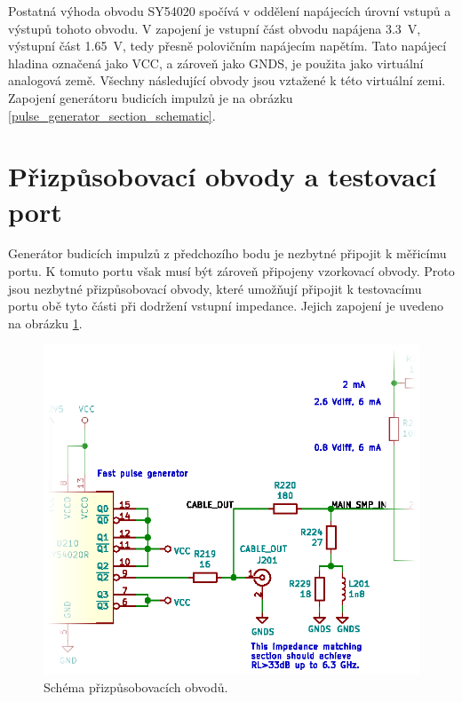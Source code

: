 Postatná výhoda obvodu SY54020 spočívá v oddělení napájecích úrovní vstupů a výstupů tohoto obvodu. V zapojení je vstupní část obvodu napájena \SI{3.3}{\volt}, výstupní část \SI{1.65}{\volt}, tedy přesně polovičním napájecím napětím. Tato napájecí hladina označená jako VCC, a zároveň jako GNDS, je použita jako virtuální analogová země. Všechny následující obvody jsou vztažené k této virtuální zemi. Zapojení generátoru budicích impulzů je na obrázku \ref{pulse_generator_section_schematic}.

\section{Přizpůsobovací obvody a testovací port}
Generátor budicích impulzů z předchozího bodu je nezbytné připojit k měřicímu portu. K tomuto portu však musí být zároveň připojeny vzorkovací obvody. Proto jsou nezbytné přizpůsobovací obvody, které umožňují připojit k testovacímu portu obě tyto části při dodržení vstupní impedance. Jejich zapojení je uvedeno na obrázku \ref{match_section_schematic}.

\begin{figure}[htbp]
\includegraphics[width=\textwidth,keepaspectratio]{images/match_section.eps}\caption{Schéma přizpůsobovacích obvodů.}\label{match_section_schematic}
\end{figure}

